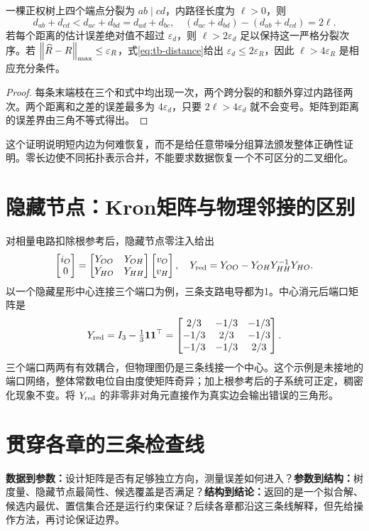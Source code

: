 \begin{proposition}[四点条件与短内边的难度]
一棵正权树上四个端点分裂为 $ab\mid cd$，内路径长度为 $\ell>0$，则
\begin{equation}
 d_{ab}+d_{cd}<d_{ac}+d_{bd}=d_{ad}+d_{bc},
 \quad (d_{ac}+d_{bd})-(d_{ab}+d_{cd})=2\ell.
\end{equation}
若每个距离的估计误差绝对值不超过 $\varepsilon_d$，则 $\ell>2\varepsilon_d$ 足以保持这一严格分裂次序。若 $\left\lVert\widehat R-R\right\rVert_{\max}\leq\varepsilon_R$，式\eqref{eq:tb-distance}给出 $\varepsilon_d\leq2\varepsilon_R$，因此 $\ell>4\varepsilon_R$ 是相应充分条件。
\end{proposition}
\begin{proof}
每条末端枝在三个和式中均出现一次，两个跨分裂的和额外穿过内路径两次。两个距离和之差的误差最多为 $4\varepsilon_d$，只要 $2\ell>4\varepsilon_d$ 就不会变号。矩阵到距离的误差界由三角不等式得出。
\end{proof}
这个证明说明短内边为何难恢复，而不是给任意带噪分组算法颁发整体正确性证明。零长边使不同拓扑表示合并，不能要求数据恢复一个不可区分的二叉细化。

\section{隐藏节点：Kron矩阵与物理邻接的区别}
对相量电路扣除根参考后，隐藏节点零注入给出
\begin{equation}
 \begin{bmatrix}i_O\\0\end{bmatrix}
 =\begin{bmatrix}Y_{OO}&Y_{OH}\\Y_{HO}&Y_{HH}\end{bmatrix}
 \begin{bmatrix}v_O\\v_H\end{bmatrix},\quad
 Y_{\rm red}=Y_{OO}-Y_{OH}Y_{HH}^{-1}Y_{HO}.
\end{equation}
以一个隐藏星形中心连接三个端口为例，三条支路电导都为1。中心消元后端口矩阵是
\begin{equation}
 Y_{\rm red}=I_3-\tfrac13\mathbf1\mathbf1^\top
 =\begin{bmatrix}2/3&-1/3&-1/3\\-1/3&2/3&-1/3\\-1/3&-1/3&2/3\end{bmatrix}.
\end{equation}
三个端口两两有有效耦合，但物理图仍是三条线接一个中心。这个示例是未接地的端口网络，整体常数电位自由度使矩阵奇异；加上根参考后的子系统可正定，稠密化现象不变。将 $Y_{\rm red}$ 的非零非对角元直接作为真实边会输出错误的三角形。

\section{贯穿各章的三条检查线}
\textbf{数据到参数：}设计矩阵是否有足够独立方向，测量误差如何进入？\textbf{参数到结构：}树度量、隐藏节点最简性、候选覆盖是否满足？\textbf{结构到结论：}返回的是一个拟合解、候选内最优、置信集合还是运行约束保证？后续各章都沿这三条线解释，但先给操作方法，再讨论保证边界。

